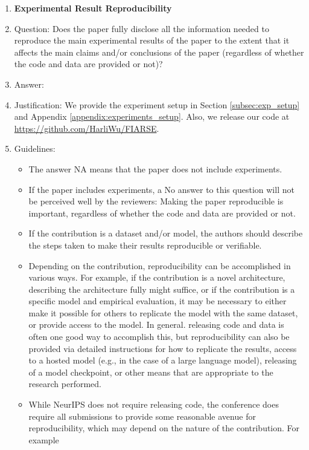 \documentclass{article}
\theoremstyle{plain}
\theoremstyle{definition}
\theoremstyle{remark}
\begin{document}
\begin{enumerate}
    \item {\bf Experimental Result Reproducibility}
    \item[] Question: Does the paper fully disclose all the information needed to reproduce the main experimental results of the paper to the extent that it affects the main claims and/or conclusions of the paper (regardless of whether the code and data are provided or not)?
    \item[] Answer: \answerYes{} %
    \item[] Justification: We provide the experiment setup in Section \ref{subsec:exp_setup} and Appendix \ref{appendix:experiments_setup}. Also, we release our code at \url{https://github.com/HarliWu/FIARSE}. 
    \item[] Guidelines:
    \begin{itemize}
        \item The answer NA means that the paper does not include experiments.
        \item If the paper includes experiments, a No answer to this question will not be perceived well by the reviewers: Making the paper reproducible is important, regardless of whether the code and data are provided or not.
        \item If the contribution is a dataset and/or model, the authors should describe the steps taken to make their results reproducible or verifiable. 
        \item Depending on the contribution, reproducibility can be accomplished in various ways. For example, if the contribution is a novel architecture, describing the architecture fully might suffice, or if the contribution is a specific model and empirical evaluation, it may be necessary to either make it possible for others to replicate the model with the same dataset, or provide access to the model. In general. releasing code and data is often one good way to accomplish this, but reproducibility can also be provided via detailed instructions for how to replicate the results, access to a hosted model (e.g., in the case of a large language model), releasing of a model checkpoint, or other means that are appropriate to the research performed.
        \item While NeurIPS does not require releasing code, the conference does require all submissions to provide some reasonable avenue for reproducibility, which may depend on the nature of the contribution. For example
        \begin{enumerate}

\end{enumerate}
\end{itemize}
\end{enumerate}
\end{document}
